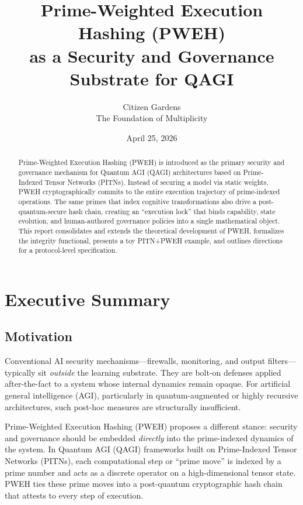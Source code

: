 \documentclass[11pt]{article}
\title{Prime-Weighted Execution Hashing (PWEH) \\
as a Security and Governance Substrate for QAGI}
\author{%
  Citizen Gardens \\ The Foundation of Multiplicity \\
}
\date{April 25, 2026}
\begin{document}
\maketitle

\begin{abstract}
Prime-Weighted Execution Hashing (PWEH) is introduced as the primary security and governance mechanism for Quantum AGI (QAGI) architectures based on Prime-Indexed Tensor Networks (PITNs).
Instead of securing a model via static weights, PWEH cryptographically commits to the entire execution trajectory of prime-indexed operations.
The same primes that index cognitive transformations also drive a post-quantum-secure hash chain, creating an ``execution lock'' that binds capability, state evolution, and human-authored governance policies into a single mathematical object.
This report consolidates and extends the theoretical development of PWEH, formalizes the integrity functional, presents a toy PITN+PWEH example, and outlines directions for a protocol-level specification.
\end{abstract}
\newpage
\tableofcontents

\section{Executive Summary}

\subsection{Motivation}

Conventional AI security mechanisms---firewalls, monitoring, and output filters---typically sit \emph{outside} the learning substrate.
They are bolt-on defenses applied after-the-fact to a system whose internal dynamics remain opaque.
For artificial general intelligence (AGI), particularly in quantum-augmented or highly recursive architectures, such post-hoc measures are structurally insufficient.

Prime-Weighted Execution Hashing (PWEH) proposes a different stance:
security and governance should be embedded \emph{directly} into the prime-indexed dynamics of the system.
In Quantum AGI (QAGI) frameworks built on Prime-Indexed Tensor Networks (PITNs), each computational step or ``prime move'' is indexed by a prime number and acts as a discrete operator on a high-dimensional tensor state.
PWEH ties these prime moves into a post-quantum cryptographic hash chain that attests to every step of execution.
\end{document}
